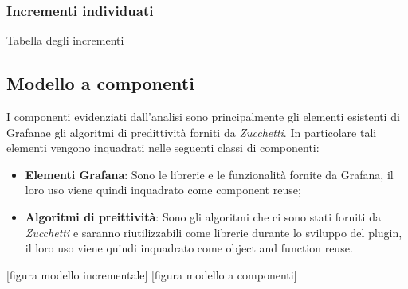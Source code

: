 \subsubsection{Incrementi individuati}
Tabella degli incrementi

\subsection{Modello a componenti}
I componenti evidenziati dall'analisi sono principalmente gli elementi esistenti di Grafana\glosp e gli algoritmi di predittività forniti da \textit{Zucchetti}.
In particolare tali elementi vengono inquadrati nelle seguenti classi di componenti:
\begin{itemize}
	\item \textbf{Elementi Grafana\glo}: Sono le librerie  e le funzionalità fornite da Grafana\glo, il loro uso viene quindi inquadrato come component reuse;
	\item \textbf{Algoritmi di preittività}: Sono gli algoritmi che ci sono stati forniti da \textit{Zucchetti} e saranno riutilizzabili come librerie durante lo sviluppo del plugin, il loro uso viene quindi inquadrato come object and function reuse.
\end{itemize}

[figura modello incrementale]
[figura modello a componenti]